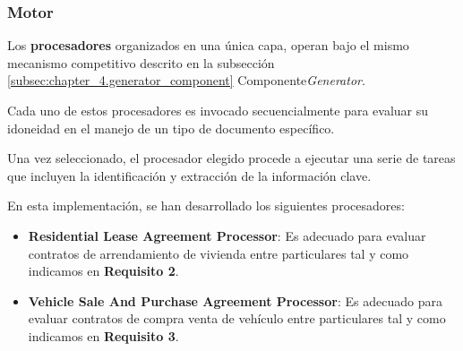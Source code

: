 \subsubsection{Motor}

Los \textbf{procesadores} organizados en una única capa,  operan bajo el mismo mecanismo competitivo descrito en la
subsección \ref{subsec:chapter_4.generator_component} Componente\textit{Generator}.

Cada uno de estos procesadores es invocado secuencialmente para evaluar su idoneidad en el manejo de un tipo de
documento específico.

Una vez seleccionado, el procesador elegido procede a ejecutar una serie de tareas que incluyen la identificación y
extracción de la información clave.

En esta implementación, se han desarrollado los siguientes procesadores:

\begin{itemize}
    \item \textbf{Residential Lease Agreement Processor}: Es adecuado para evaluar contratos de arrendamiento de vivienda entre
    particulares tal y como indicamos en \textbf{Requisito 2}.
    \item \textbf{Vehicle Sale And Purchase Agreement Processor}: Es adecuado para evaluar contratos de compra venta de vehículo
    entre particulares tal y como indicamos en \textbf{Requisito 3}.
\end{itemize}
